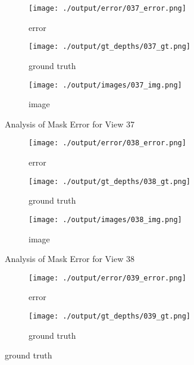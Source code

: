 \documentclass{article}
\begin{document}
\begin{figure}
\end{figure}\begin{figure}
	\centering
	\begin{subfigure}{0.3\textwidth}
		\centering
		\texttt{[image: ./output/error/037\_error.png]}
		\caption{error}
		\label{fig:error37}
	\end{subfigure}
	\hfill
	\centering
	\begin{subfigure}{0.3\textwidth}
		\centering
		\texttt{[image: ./output/gt\_depths/037\_gt.png]}
		\caption{ground truth}
		\label{fig:gt37}
	\end{subfigure}
	\hfill
	\centering
	\begin{subfigure}{0.3\textwidth}
		\centering
		\texttt{[image: ./output/images/037\_img.png]}
		\caption{image}
		\label{fig:img37}
	\end{subfigure}
	\hfill
	\caption{Analysis of Mask Error for View 37}
	\label{fig:error_analys37}
\end{figure}\begin{figure}
	\centering
	\begin{subfigure}{0.3\textwidth}
		\centering
		\texttt{[image: ./output/error/038\_error.png]}
		\caption{error}
		\label{fig:error38}
	\end{subfigure}
	\hfill
	\centering
	\begin{subfigure}{0.3\textwidth}
		\centering
		\texttt{[image: ./output/gt\_depths/038\_gt.png]}
		\caption{ground truth}
		\label{fig:gt38}
	\end{subfigure}
	\hfill
	\centering
	\begin{subfigure}{0.3\textwidth}
		\centering
		\texttt{[image: ./output/images/038\_img.png]}
		\caption{image}
		\label{fig:img38}
	\end{subfigure}
	\hfill
	\caption{Analysis of Mask Error for View 38}
	\label{fig:error_analys38}
\end{figure}\begin{figure}
	\centering
	\begin{subfigure}{0.3\textwidth}
		\centering
		\texttt{[image: ./output/error/039\_error.png]}
		\caption{error}
		\label{fig:error39}
	\end{subfigure}
	\hfill
	\centering
	\begin{subfigure}{0.3\textwidth}
		\centering
		\texttt{[image: ./output/gt\_depths/039\_gt.png]}
		\caption{ground truth}
		\label{fig:gt39}
	\end{subfigure}

\end{figure}
\end{document}
